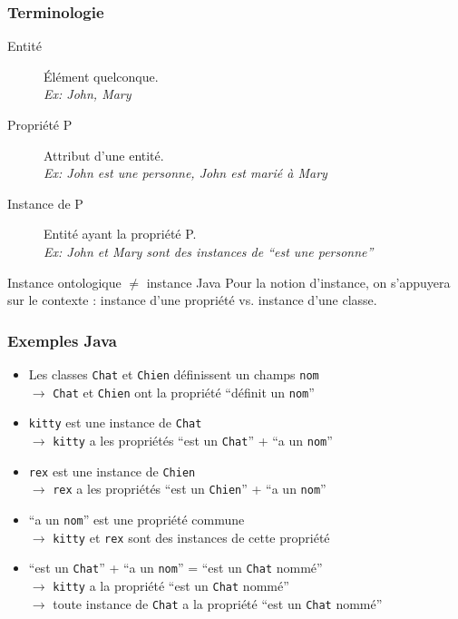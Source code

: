 \documentclass[draft]{beamer}
\begin{document}
\begin{frame}
\frametitle{Terminologie}
\begin{description}
 \item[Entité] Élément quelconque.\\
      {\footnotesize\textit{Ex: John, Mary}}
 \item[Propriété P] Attribut d'une entité.\\
      {\footnotesize\textit{Ex: John est une personne, John est marié à Mary}}
 \item[Instance de P] Entité ayant la propriété P.\\
      {\footnotesize\textit{Ex: John et Mary sont des instances de ``est une personne''}}
\end{description}
\begin{alertblock}{Instance ontologique $\neq$ instance Java}
 Pour la notion d'instance, on s'appuyera sur le contexte : instance d'une propriété vs. instance d'une classe.
\end{alertblock}
\end{frame}

\begin{frame}
\frametitle{Exemples Java}
\def\classA{\lstinline{Chat}\xspace}
\def\classB{\lstinline{Chien}\xspace}
\def\instA{\lstinline{kitty}\xspace}
\def\instB{\lstinline{rex}\xspace}
\def\field{\lstinline{nom}\xspace}
\begin{itemize}
 \item Les classes \classA et \classB définissent un champs \field
       \\$\rightarrow$ \classA et \classB ont la propriété ``définit un \field''
 \item \instA est une instance de \classA
       \\$\rightarrow$ \instA a les propriétés ``est un \classA'' + ``a un \field''
 \item \instB est une instance de \classB
       \\$\rightarrow$ \instB a les propriétés ``est un \classB'' + ``a un \field''
 \item ``a un \field'' est une propriété commune
       \\$\rightarrow$ \instA et \instB sont des instances de cette propriété
 \item ``est un \classA'' + ``a un \field'' = ``est un \classA nommé''
       \\$\rightarrow$ \instA a la propriété ``est un \classA nommé''
       \\$\rightarrow$ toute instance de \classA a la propriété ``est un \classA nommé''
\end{itemize}
\end{frame}
\end{document}
